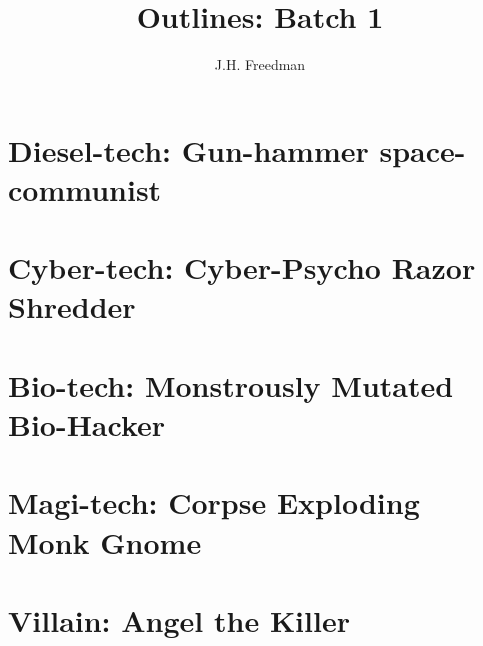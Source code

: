 \documentclass[]{article}
\title{Outlines: Batch 1}
\author{J.H. Freedman}
\begin{document}
\maketitle

\section{Diesel-tech: Gun-hammer space-communist}

\section{Cyber-tech: Cyber-Psycho Razor Shredder}

\section{Bio-tech: Monstrously Mutated Bio-Hacker}

\section{Magi-tech: Corpse Exploding Monk Gnome}

\section{Villain: Angel the Killer}
\end{document}
